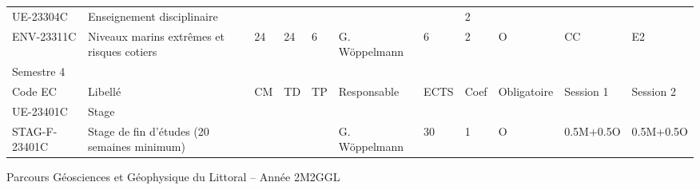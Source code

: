 \documentclass[a4paper,11pt]{article}
\begin{document}
{{\begin{tabular}{lllllllllll}
\rowcolor[HTML]{C0C0C0} 
UE-23304C                      & Enseignement disciplinaire                    &                           &                           &                           &                                    &                             & 2                           &                                    &                                  &                                  \\
ENV-23311C                     & Niveaux marins extrêmes et risques cotiers    & 24                        & 24                        & 6                         & G. Wöppelmann                      & 6                           & 2                           & O                                  & CC                               & E2                               \\
\rowcolor[HTML]{656565} 
Semestre 4                     &                                               &                           &                           &                           &                                    &                             &                             &                                    &                                  &                                  \\
\rowcolor[HTML]{9B9B9B} 
Code EC                        & Libellé                                       & CM                        & TD                        & TP                        & Responsable                        & ECTS                        & Coef                        & Obligatoire                        & Session 1                        & Session 2                        \\
\rowcolor[HTML]{C0C0C0} 
UE-23401C                      & Stage                                         &                           &                           &                           &                                    &                             &                             &                                    &                                  &                                  \\
STAG-F-23401C                  & Stage de fin d'études (20 semaines minimum)   &                           &                           &                           & G. Wöppelmann                      & 30                          & 1                           & O                                  & 0.5M+0.5O                        & 0.5M+0.5O                       
\end{tabular}}
}{Parcours Géosciences et Géophysique du Littoral -- Année 2}{M2GGL}
\end{document}
